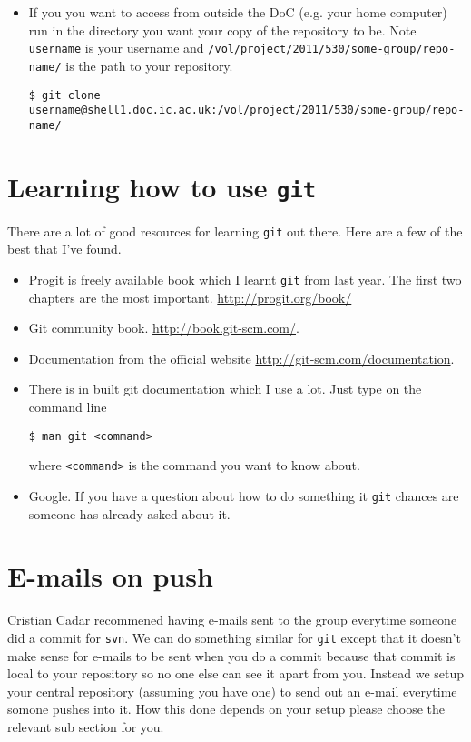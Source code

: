 \documentclass[a4paper,10pt,fleqn]{article}
\begin{document}
\begin{enumerate}
\begin{itemize}
			\item If you you want to access from outside the DoC (e.g. your home computer) run in the directory you want your copy of the repository to be. Note \texttt{username} is your username and \texttt{/vol/project/2011/530/some-group/repo-name/} is the path to your repository.
			\begin{lstlisting}
$ git clone username@shell1.doc.ic.ac.uk:/vol/project/2011/530/some-group/repo-name/
			\end{lstlisting}

		\end{itemize}

		\end{enumerate}

\section{Learning how to use \texttt{git}}
There are a lot of good resources for learning \texttt{git} out there. Here are a few of the best that I've found.
\begin{itemize}
	\item Progit is freely available book which I learnt \texttt{git} from last year. The first two chapters are the most important. \url{http://progit.org/book/} 
	\item Git community book. \url{http://book.git-scm.com/}.
	\item Documentation from the official website \url{http://git-scm.com/documentation}.
	\item There is in built git documentation which I use a lot. Just type on the command line
	\begin{lstlisting}
$ man git <command>
	\end{lstlisting}
	where \texttt{<command>} is the command you want to know about.
	\item Google. If you have a question about how to do something it \texttt{git} chances are someone has already asked about it.

\end{itemize}

\section{E-mails on push}
Cristian Cadar recommened having e-mails sent to the group everytime someone did a commit for \texttt{svn}. We can do something similar for \texttt{git} except that it doesn't make sense for e-mails to be sent when you do a commit because that commit is local to your repository so no one else can see it apart from you. Instead we setup your central repository (assuming you have one) to send out an e-mail everytime somone pushes into it. How this done depends on your setup please choose the relevant sub section for you.
\end{document}
